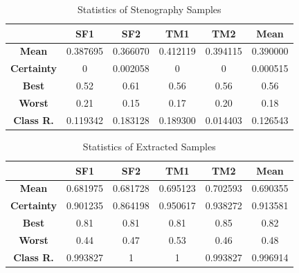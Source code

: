 \documentclass[journal]{IEEEtran} %
\begin{document}
\begin{table}[htbp]
    \centering
    \caption{Statistics of Stenography Samples}
    \begin{tabular}{|c|c|c|c|c|c|}
        \hline
        & \textbf{SF1} & \textbf{SF2} & \textbf{TM1} & \textbf{TM2} & \textbf{Mean} \\
        \hline
        \textbf{Mean} & 0.387695 & 0.366070 & 0.412119 & 0.394115 & 0.390000 \\
        \hline
        \textbf{Certainty} & 0 & 0.002058 & 0 & 0 & 0.000515 \\
        \hline
        \textbf{Best} & 0.52 & 0.61 & 0.56 & 0.56 & 0.56 \\
        \hline
        \textbf{Worst} & 0.21 & 0.15 & 0.17 & 0.20 & 0.18 \\
        \hline
        \textbf{Class R.} & 0.119342 & 0.183128 & 0.189300 & 0.014403 & 0.126543 \\
        \hline
    \end{tabular}
    \label{tab:st_msg}
\end{table}

\begin{table}[htbp]
    \centering
    \caption{Statistics of Extracted Samples}
    \begin{tabular}{|c|c|c|c|c|c|}
        \hline
        & \textbf{SF1} & \textbf{SF2} & \textbf{TM1} & \textbf{TM2} & \textbf{Mean} \\
        \hline
        \textbf{Mean} & 0.681975 & 0.681728 & 0.695123 & 0.702593 & 0.690355 \\
        \hline
        \textbf{Certainty} & 0.901235 & 0.864198 & 0.950617 & 0.938272 & 0.913581 \\
        \hline
        \textbf{Best} & 0.81 & 0.81 & 0.81 & 0.85 & 0.82 \\
        \hline
        \textbf{Worst} & 0.44 & 0.47 & 0.53 & 0.46 & 0.48 \\
        \hline
        \textbf{Class R.} & 0.993827 & 1 & 1 & 0.993827 & 0.996914 \\
        \hline
    \end{tabular}
    \label{tab:st_rec}
\end{table}
\end{document}
